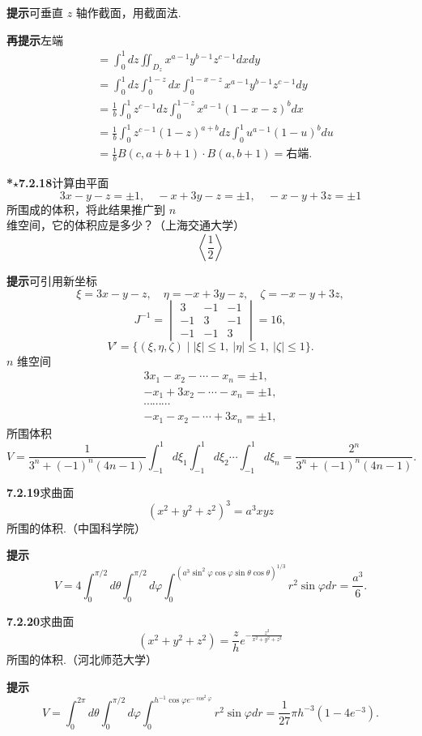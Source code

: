 \documentclass[UTF8, 12pt, fontset=fandol, oneside]{ctexart}
\begin{document}
\noindent\textbf{提示}\quad 可垂直 $z$ 轴作截面，用截面法.

\noindent\textbf{再提示}\quad 左端
\[
\begin{aligned}
&=\int_0^1dz\iint_{D_z}x^{a-1}y^{b-1}z^{c-1}dxdy\\
&=\int_0^1dz\int_0^{1-z}dx\int_0^{1-x-z}x^{a-1}y^{b-1}z^{c-1}dy\\
&=\frac1b\int_0^1z^{c-1}dz\int_0^{1-z}x^{a-1}(1-x-z)^bdx\\
&=\frac1b\int_0^1z^{c-1}(1-z)^{a+b}dz
\int_0^1u^{a-1}(1-u)^bdu\\
&=\frac1b B(c,a+b+1)\cdot B(a,b+1)=\text{右端}.
\end{aligned}
\]

\noindent\textbf{*$\star$7.2.18}\quad 计算由平面
\[
3x-y-z=\pm1,\quad -x+3y-z=\pm1,\quad -x-y+3z=\pm1
\]
所围成的体积，将此结果推广到 $n$ 维空间，它的体积应是多少？（上海交通大学）
\[
\left\langle\frac12\right\rangle
\]

\noindent\textbf{提示}\quad 可引用新坐标
\[
\xi=3x-y-z,\quad \eta=-x+3y-z,\quad \zeta=-x-y+3z,
\]
\[
J^{-1}=\begin{vmatrix}3&-1&-1\\-1&3&-1\\-1&-1&3\end{vmatrix}=16,
\]
\[
V'=\{(\xi,\eta,\zeta)\mid |\xi|\le1,\ |\eta|\le1,\ |\zeta|\le1\}.
\]
$n$ 维空间
\[
\begin{gathered}
3x_1-x_2-\cdots-x_n=\pm1,\\
-x_1+3x_2-\cdots-x_n=\pm1,\\
\cdots\cdots\cdots\\
-x_1-x_2-\cdots+3x_n=\pm1,
\end{gathered}
\]
所围体积
\[
V=\frac1{3^n+(-1)^n(4n-1)}\int_{-1}^1d\xi_1
\int_{-1}^1d\xi_2\cdots\int_{-1}^1d\xi_n
=\frac{2^n}{3^n+(-1)^n(4n-1)}.
\]

\noindent\textbf{7.2.19}\quad 求曲面
\[
(x^2+y^2+z^2)^3=a^3xyz
\]
所围的体积.（中国科学院）

\noindent\textbf{提示}\quad
\[
V=4\int_0^{\pi/2}d\theta\int_0^{\pi/2}d\varphi
\int_0^{(a^3\sin^2\varphi\cos\varphi\sin\theta\cos\theta)^{1/3}}
r^2\sin\varphi dr
=\frac{a^3}{6}.
\]

\noindent\textbf{7.2.20}\quad 求曲面
\[
(x^2+y^2+z^2)=\frac zh e^{-\frac{z^2}{x^2+y^2+z^2}}
\]
所围的体积.（河北师范大学）

\noindent\textbf{提示}\quad
\[
V=\int_0^{2\pi}d\theta\int_0^{\pi/2}d\varphi
\int_0^{h^{-1}\cos\varphi e^{-\cos^2\varphi}}r^2\sin\varphi dr
=\frac1{27}\pi h^{-3}(1-4e^{-3}).
\]
\end{document}
